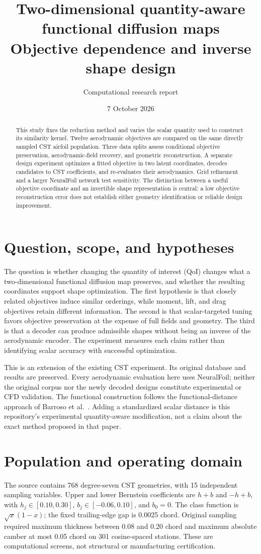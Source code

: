 \documentclass[11pt,a4paper]{article}
\title{Two-dimensional quantity-aware functional diffusion maps\\Objective dependence and inverse shape design}
\author{Computational research report}
\date{7 October 2026}
\begin{document}
\maketitle
\begin{abstract}
This study fixes the reduction method and varies the scalar quantity used to construct its similarity kernel. Twelve aerodynamic objectives are compared on the same directly sampled CST airfoil population. Three data splits assess conditional objective preservation, aerodynamic-field recovery, and geometric reconstruction. A separate design experiment optimizes a fitted objective in two latent coordinates, decodes candidates to CST coefficients, and re-evaluates their aerodynamics. Grid refinement and a larger NeuralFoil network test sensitivity. The distinction between a useful objective coordinate and an invertible shape representation is central: a low objective reconstruction error does not establish either geometry identification or reliable design improvement.
\end{abstract}
\tableofcontents
\section{Question, scope, and hypotheses}
The question is whether changing the quantity of interest (QoI) changes what a two-dimensional functional diffusion map preserves, and whether the resulting coordinates support shape optimization. The first hypothesis is that closely related objectives induce similar orderings, while moment, lift, and drag objectives retain different information. The second is that scalar-targeted tuning favors objective preservation at the expense of full fields and geometry. The third is that a decoder can produce admissible shapes without being an inverse of the aerodynamic encoder. The experiment measures each claim rather than identifying scalar accuracy with successful optimization.

This is an extension of the existing CST experiment. Its original database and results are preserved. Every aerodynamic evaluation here uses NeuralFoil; neither the original corpus nor the newly decoded designs constitute experimental or CFD validation. The functional construction follows the functional-distance approach of Barroso et al.\ \cite{barroso2024}. Adding a standardized scalar distance is this repository's experimental quantity-aware modification, not a claim about the exact method proposed in that paper.

\section{Population and operating domain}
The source contains 768 degree-seven CST geometries, with 15 independent sampling variables. Upper and lower Bernstein coefficients are $h+b$ and $-h+b$, with $h_j\in[0.10,0.30]$, $b_j\in[-0.06,0.10]$, and $b_0=0$. The class function is $\sqrt{x}(1-x)$; the fixed trailing-edge gap is 0.0025 chord. Original sampling required maximum thickness between 0.08 and 0.20 chord and maximum absolute camber at most 0.05 chord on 301 cosine-spaced stations. These are computational screens, not structural or manufacturing certification.
\end{document}
